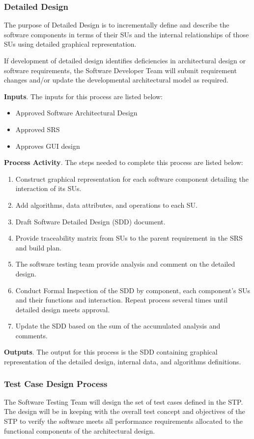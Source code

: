 \documentclass[a4paper, 11pt]{article}
\begin{document}
\subsubsection{Detailed Design}
The purpose of Detailed Design is to incrementally define and describe the software components in terms of their SUs and the internal relationships of those SUs using detailed graphical representation.

If development of detailed design identifies deficiencies in architectural design or software requirements, the Software Developer Team will submit requirement changes and/or update the
developmental architectural model as required.

\textbf{Inputs}. The inputs for this process are listed below:
\begin{itemize}
	\item Approved Software Architectural Design
	\item Approved SRS
	\item Approves GUI design
\end{itemize}

\textbf{Process Activity}. The steps needed to complete this process are listed below:
\begin{enumerate}
	\item Construct graphical representation for each software component detailing the interaction of its SUs.
	\item Add algorithms, data attributes, and operations to each SU.
	\item Draft Software Detailed Design (SDD) document.
	\item Provide traceability matrix from SUs to the parent requirement in the SRS and build plan.
	\item The software testing team provide analysis and comment on the detailed design.
	\item Conduct Formal Inspection of the SDD by component, each component's SUs and their functions and interaction. Repeat process several times until detailed design meets approval.
	\item Update the SDD based on the sum of the accumulated analysis and comments.
\end{enumerate}

\textbf{Outputs}. The output for this process is the SDD containing graphical representation of the detailed design, internal data, and algorithms definitions.

\subsubsection{Test Case Design Process}
The Software Testing Team will design the set of test cases defined in the STP. The design will be in keeping with the overall test concept and objectives of the STP to verify the software meets all performance requirements allocated to the functional components of the architectural design.
\end{document}

